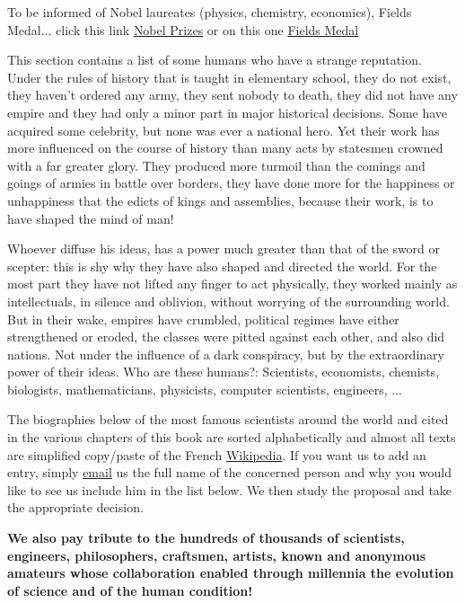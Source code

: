 To be informed of Nobel laureates (physics, chemistry, economics), Fields Medal... click this link {\href{http://www.nobelprize.org/}{{\color{blue}Nobel Prizes}}} or on this one {\href{http://www.fields.utoronto.ca/aboutus/jcfields/fields_medal.html}{{\color{blue}Fields Medal}}}

This section contains a list of some humans who have a strange reputation. Under the rules of history that is taught in elementary school, they do not exist, they haven't ordered any army, they sent nobody to death, they did not have any empire and they had only a minor part in major historical decisions. Some have acquired some celebrity, but none was ever a national hero. Yet their work has more influenced on the course of history than many acts by statesmen crowned with a far greater glory. They produced more turmoil than the comings and goings of armies in battle over borders, they have done more for the happiness or unhappiness that the edicts of kings and assemblies, because their work, is to have shaped the mind of man!

Whoever diffuse his ideas, has a power much greater than that of the sword or scepter: this is shy why they have also shaped and directed the world. For the most part they have not lifted any finger to act physically, they worked mainly as intellectuals, in silence and oblivion, without worrying of the surrounding world. But in their wake, empires have crumbled, political regimes have either strengthened or eroded, the classes were pitted against each other, and also did nations. Not under the influence of a dark conspiracy, but by the extraordinary power of their ideas. Who are these humans?: Scientists, economists, chemists, biologists, mathematicians, physicists, computer scientists, engineers, ...

The biographies below of the most famous scientists around the world and cited in the various chapters of this book are sorted alphabetically and almost all texts are simplified copy/paste of the French {\href{http://www.wikipedia.fr}{{\color{blue}Wikipedia}}}. If you want us to add an entry, simply  {\href{mailto:isoz@sciences.ch}{{\color{blue}email}}} us the full name of the concerned person and why you would like to see us include him in the list below. We then study the proposal and take the appropriate decision.

\textbf{We also pay tribute to the hundreds of thousands of scientists, engineers, philosophers, craftsmen, artists, known and anonymous amateurs whose collaboration enabled through millennia the evolution of science and of the human condition!}

